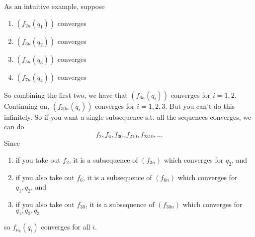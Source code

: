   As an intuitive example, suppose 
  \begin{enumerate}
    \item $(f_{2n} (q_1))$ converges 
    \item $(f_{3n} (q_2))$ converges 
    \item $(f_{5n} (q_3))$ converges 
    \item $(f_{7n} (q_4))$ converges 
  \end{enumerate}
  So combining the first two, we have that $(f_{6n}(q_i))$ converges for $i = 1, 2$. Continuing on, $(f_{30n} (q_i))$ converges for $i = 1, 2, 3$. But you can't do this infinitely. So if you want a single subsequence s.t. all the sequences converges, we can do 
  \begin{equation}
    f_2, f_6, f_{30}, f_{210}, f_{2310}, \ldots
  \end{equation}
  Since 
  \begin{enumerate}
    \item if you take out $f_2$, it is a subsequence of $(f_{3n})$ which converges for $q_2$, and 
    \item if you also take out $f_{6}$, it is a subsequence of $(f_{6n})$ which converges for $q_1, q_2$, and 
    \item if you also take out $f_{30}$, it is a subsequence of $(f_{30n})$ which converges for $q_1, q_2, q_3$
  \end{enumerate}
  so $f_{n_k} (q_i)$ converges for all $i$. 

